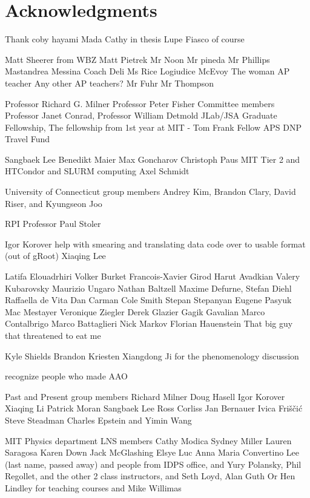 \section*{Acknowledgments}


\iffalse

Thank coby hayami Mada Cathy in thesis
Lupe Fiasco of course


Matt Sheerer from WBZ
Matt Pietrek
Mr Noon Mr pineda Mr Phillips
Mastandrea
Messina
Coach Deli
Ms Rice
Logiudice
McEvoy
The woman AP teacher
Any other AP teachers?
Mr Fuhr
Mr Thompson




Professor Richard G. Milner
Professor Peter Fisher
Committee members Professor Janet Conrad, Professor William Detmold
JLab/JSA Graduate Fellowship, 
The fellowship from 1st year at MIT - Tom Frank Fellow
APS DNP Travel Fund

Sangbaek Lee
Benedikt Maier
Max Goncharov
Christoph Paus
MIT Tier 2 and HTCondor and SLURM computing
Axel Schmidt

University of Connecticut group members Andrey Kim, Brandon Clary, David Riser, and Kyungseon Joo

RPI Professor Paul Stoler


Igor Korover help with smearing and translating data code over to usable format (out of gRoot)
Xiaqing Lee

Latifa Elouadrhiri
Volker Burket
Francois-Xavier Girod
Harut Avadkian
Valery Kubarovsky
Maurizio Ungaro
Nathan Baltzell
Maxime Defurne,
Stefan Diehl
Raffaella de Vita
Dan Carman
Cole Smith
Stepan Stepanyan
Eugene Pasyuk
Mac Mestayer
Veronique Ziegler
Derek Glazier
Gagik Gavalian
Marco Contalbrigo
Marco Battaglieri
Nick Markov
Florian Hauenstein
That big guy that threatened to eat me

Kyle Shields
Brandon Kriesten
Xiangdong Ji
for the phenomenology discussion

recognize people who made AAO 

Past and Present group members
Richard Milner Doug Hasell Igor Korover Xiaqing Li Patrick Moran Sangbaek Lee Ross Corliss Jan Bernauer Ivica Friščić Steve Steadman Charles Epstein and Yimin Wang

MIT Physics department LNS members Cathy Modica Sydney Miller Lauren Saragosa Karen Down Jack McGlashing Elsye Luc Anna Maria Convertino Lee (last name, passed away) 
and people from IDPS office, and Yury Polansky, Phil Regollet, and the other 2 class instructors, and Seth Loyd, Alan Guth Or Hen Lindley for teaching courses and Mike Willimas

